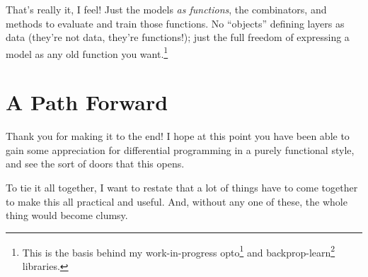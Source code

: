 \documentclass[]{article}
\renewcommand{\href}[2]{#2\footnote{\url{#1}}}
\begin{document}
That's really it, I feel! Just the models \emph{as functions}, the combinators,
and methods to evaluate and train those functions. No ``objects'' defining
layers as data (they're not data, they're functions!); just the full freedom of
expressing a model as any old function you want.\footnote{This is the basis
  behind my work-in-progress \href{https://github.com/mstksg/opto}{opto} and
  \href{https://github.com/mstksg/backprop-learn}{backprop-learn} libraries.}

\section{A Path Forward}\label{a-path-forward}

Thank you for making it to the end! I hope at this point you have been able to
gain some appreciation for differential programming in a purely functional
style, and see the sort of doors that this opens.

To tie it all together, I want to restate that a lot of things have to come
together to make this all practical and useful. And, without any one of these,
the whole thing would become clumsy.
\end{document}
